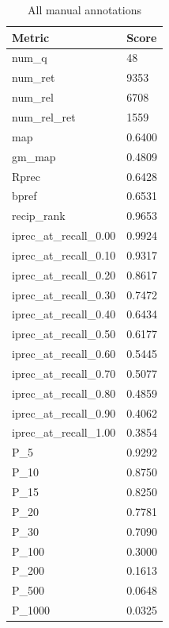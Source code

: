 \begin{table}[htb]
    \centering
    \begin{tabular}{ | l | l | }
    \hline
    Metric & Score \\ \hline
    num\_q & 48 \\ \hline
    num\_ret & 9353 \\ \hline
    num\_rel & 6708 \\ \hline
    num\_rel\_ret & 1559 \\ \hline
    map & 0.6400 \\ \hline
    gm\_map & 0.4809 \\ \hline
    Rprec & 0.6428 \\ \hline
    bpref & 0.6531 \\ \hline
    recip\_rank & 0.9653 \\ \hline
    iprec\_at\_recall\_0.00 & 0.9924 \\ \hline
    iprec\_at\_recall\_0.10 & 0.9317 \\ \hline
    iprec\_at\_recall\_0.20 & 0.8617 \\ \hline
    iprec\_at\_recall\_0.30 & 0.7472 \\ \hline
    iprec\_at\_recall\_0.40 & 0.6434 \\ \hline
    iprec\_at\_recall\_0.50 & 0.6177 \\ \hline
    iprec\_at\_recall\_0.60 & 0.5445 \\ \hline
    iprec\_at\_recall\_0.70 & 0.5077 \\ \hline
    iprec\_at\_recall\_0.80 & 0.4859 \\ \hline
    iprec\_at\_recall\_0.90 & 0.4062 \\ \hline
    iprec\_at\_recall\_1.00 & 0.3854 \\ \hline
    P\_5 & 0.9292 \\ \hline
    P\_10 & 0.8750 \\ \hline
    P\_15 & 0.8250 \\ \hline
    P\_20 & 0.7781 \\ \hline
    P\_30 & 0.7090 \\ \hline
    P\_100 & 0.3000 \\ \hline
    P\_200 & 0.1613 \\ \hline
    P\_500 & 0.0648 \\ \hline
    P\_1000 & 0.0325 \\ \hline
    \end{tabular}
    \caption{All manual annotations}
    \label{table:manual-all}
\end{table}

